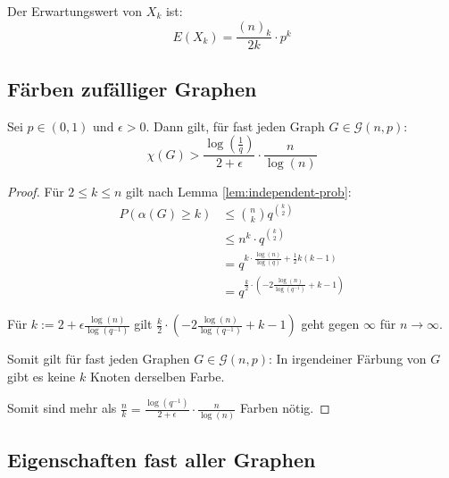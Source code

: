 \begin{proposition}
    Der Erwartungswert von $ X_k $ ist:
    \begin{equation*}
        E(X_k) = \frac{(n)_k}{2k} \cdot p^k
    \end{equation*}
\end{proposition}

\subsection{Färben zufälliger Graphen}

\begin{proposition}
    Sei $ p \in (0, 1) $ und $ \epsilon > 0 $.
    Dann gilt, für fast jeden Graph $ G \in \mathcal{G}(n, p) $:
    \begin{equation*}
        \chi(G) > \frac{\log(\frac{1}{q})}{2 + \epsilon} \cdot \frac{n}{\log(n)}
    \end{equation*}
\end{proposition}

\begin{proof}
    Für $ 2 \leq k \leq n $ gilt nach Lemma \ref{lem:independent-prob}:
    \begin{align*}
        P(\alpha(G) \geq k) & \leq \binom{n}{k} q^{\binom{k}{2}} \\
        & \leq n^k \cdot q^{\binom{k}{2}} \\
        &= q^{k \cdot \frac{\log(n)}{\log(q)} + \frac{1}{2}k(k - 1)} \\
        &= q^{\frac{k}{2} \cdot (-2 \frac{\log(n)}{\log(q^{-1})} + k - 1)}
    \end{align*}

    Für $ k := 2 + \epsilon \frac{\log(n)}{\log(q^{-1})} $ gilt $ \frac{k}{2} \cdot (-2 \frac{\log(n)}{\log(q^{-1})} + k - 1) $ geht gegen $ \infty $ für $ n \rightarrow \infty $.

    Somit gilt für fast jeden Graphen $ G \in \mathcal{G}(n, p) $: In irgendeiner Färbung von $ G $ gibt es keine $ k $ Knoten derselben Farbe.

    Somit sind mehr als $ \frac{n}{k} = \frac{\log(q^{-1})}{2 + \epsilon} \cdot \frac{n}{\log(n)} $ Farben nötig.
\end{proof}

\subsection{Eigenschaften fast aller Graphen}

